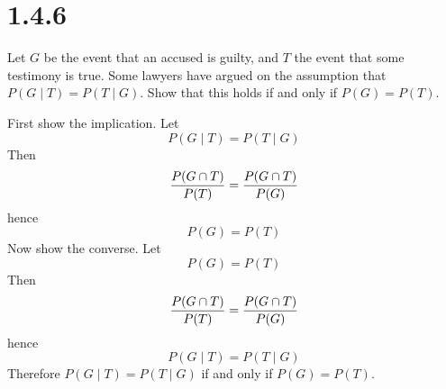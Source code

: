 \section*{1.4.6}
Let $G$ be the event that an accused is guilty, and $T$ the event that
some testimony is true.
Some lawyers have argued on the assumption that
$P(G\mid T)=P(T\mid G)$.
Show that this holds if and only if $P(G)=P(T)$.

\bigskip
\noindent
First show the implication.
Let
$$P(G\mid T)=P(T\mid G)$$
Then
$${P(G\cap T)\over P(T)}={P(G\cap T)\over P(G)}$$
hence
$$P(G)=P(T)$$
Now show the converse. Let
$$P(G)=P(T)$$
Then
$${P(G\cap T)\over P(T)}={P(G\cap T)\over P(G)}$$
hence
$$P(G\mid T)=P(T\mid G)$$
Therefore $P(G\mid T)=P(T\mid G)$ if and only if
$P(G)=P(T)$.

